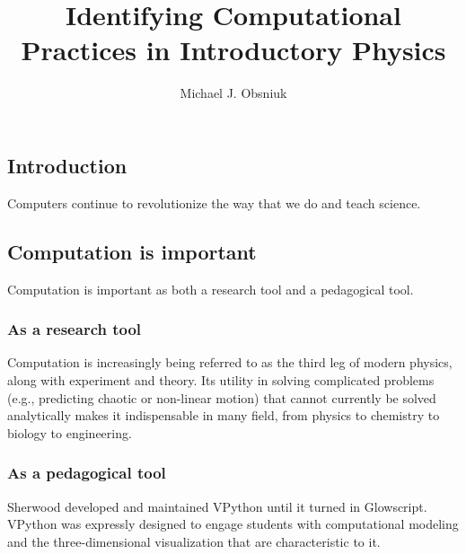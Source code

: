 \documentclass{msuphddissertation}
\author{Michael J. Obsniuk}
\title{Identifying Computational Practices in Introductory Physics}
\begin{document}


\TOC

\newpage
{}
\begin{doublespace}

%
%

\chapter{Introduction}

Computers continue to revolutionize the way that we do and teach science.  

\section{Computation is important}

Computation is important as both a research tool and a pedagogical tool.

\subsection{As a research tool}

Computation is increasingly being referred to as the third leg of modern physics, along with experiment and theory.  Its utility in solving complicated problems (e.g., predicting chaotic or non-linear motion) that cannot currently be solved analytically makes it indispensable in many field, from physics to chemistry to biology to engineering.

\subsection{As a pedagogical tool}

Sherwood developed and maintained VPython until it turned in Glowscript.  VPython was expressly designed to engage students with computational modeling and the three-dimensional visualization that are characteristic to it.


\end{doublespace}
\end{document}
